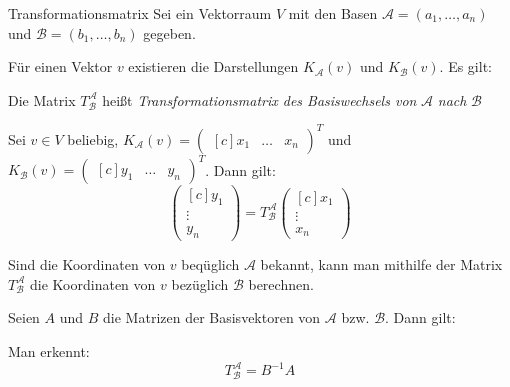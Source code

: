 \documentclass[german]{../spicker}
\newcommand{\vektor}[1]{\begin{pmatrix*}[c] #1 \end{pmatrix*}}
\begin{document}
\begin{defi}{Transformationsmatrix}
    Sei ein Vektorraum $V$ mit den Basen $\mathcal{A} = (a_1, \ldots, a_n)$ und $\mathcal{B} = (b_1, \ldots, b_n)$ gegeben.

    Für einen Vektor $v$ existieren die Darstellungen $K_{\mathcal{A}}(v)$ und $K_{\mathcal{B}}(v)$.
    Es gilt:

    \begin{center}
    \end{center}


    Die Matrix $T^{\mathcal{A}}_{\mathcal{B}}$ heißt \emph{Transformationsmatrix des Basiswechsels von} $\mathcal{A}$ \emph{nach} $\mathcal{B}$

    Sei $v\in V$ beliebig, $K_{\mathcal{A}}(v) = \vektor{x_1 & \ldots & x_n}^T$ und $K_{\mathcal{B}}(v) = \vektor{y_1 & \ldots & y_n}^T$. Dann gilt:
    $$
        \vektor{y_1 \\ \vdots \\ y_n} = T^{\mathcal{A}}_{\mathcal{B}} \vektor{x_1 \\ \vdots \\ x_n}
    $$

    Sind die Koordinaten von $v$ beqüglich $\mathcal{A}$ bekannt, kann man mithilfe der Matrix $T^{\mathcal{A}}_{\mathcal{B}}$ die Koordinaten von $v$ bezüglich $\mathcal{B}$ berechnen.

    Seien $A$ und $B$ die Matrizen der Basisvektoren von $\mathcal{A}$ bzw. $\mathcal{B}$.
    Dann gilt:

    \begin{center}
    \end{center}

    Man erkennt:
    $$
        T^{\mathcal{A}}_{\mathcal{B}} = B^{-1}A
    $$
\end{defi}
\end{document}
